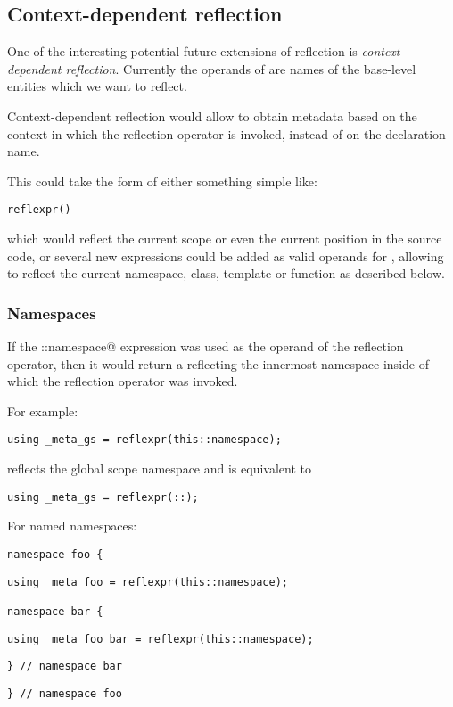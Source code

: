 \subsection{Context-dependent reflection}
\label{context-dependent-reflection}

One of the interesting potential future extensions of reflection
is {\em context-dependent reflection}. Currently the operands of \verb@reflexpr@
are names of the base-level entities which we want to reflect.

Context-dependent reflection would allow to obtain metadata based on the context
in which the reflection operator is invoked, instead of on the declaration name.

This could take the form of either something simple like:

\begin{verbatim}
reflexpr()
\end{verbatim}

which would reflect the current scope or even the current position in the
source code, or several new expressions could be added as valid operands for
\verb@reflexpr@, allowing to reflect the current namespace, class, template
or function as described below.

\subsubsection{Namespaces}

If the \verb@this::namespace@ expression was used as the operand of the reflection
operator, then it would return a  reflecting the innermost namespace
inside of which the reflection operator was invoked.

For example:

\begin{verbatim}
using _meta_gs = reflexpr(this::namespace);
\end{verbatim}

reflects the global scope namespace and is equivalent to

\begin{verbatim}
using _meta_gs = reflexpr(::);
\end{verbatim}

For named namespaces:

\begin{verbatim}
namespace foo {
\end{verbatim}
\begin{verbatim}
using _meta_foo = reflexpr(this::namespace);

namespace bar {
\end{verbatim}
\begin{verbatim}
using _meta_foo_bar = reflexpr(this::namespace);
\end{verbatim}
\begin{verbatim}
} // namespace bar
\end{verbatim}
\begin{verbatim}
} // namespace foo
\end{verbatim}

